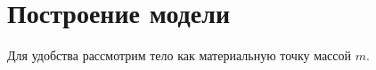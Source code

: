 \pagebreak

\section{Построение модели}
	Для удобства рассмотрим тело как материальную точку массой \( m \).



\pagebreak